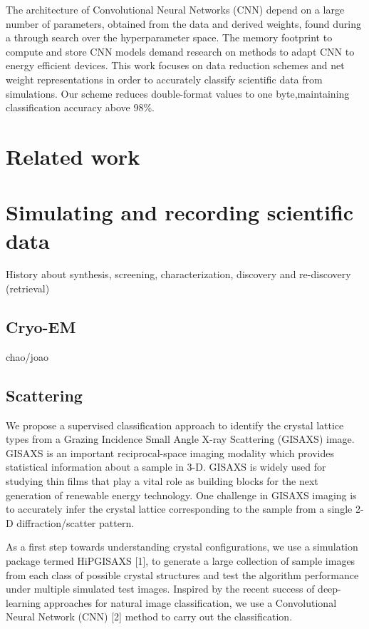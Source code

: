 \documentclass[conference]{IEEEtran}
\begin{document}
The architecture of Convolutional Neural Networks (CNN) depend on a
large number of parameters, obtained from the data and derived weights,
found during a through search over the hyperparameter space. The
memory footprint to compute and store CNN models demand research
on methods to adapt CNN to energy efficient devices. This work focuses
on data reduction schemes and net weight representations in order to
accurately classify scientific data from simulations. Our scheme reduces
double-format values to one byte,maintaining classification accuracy
above 98\%.

\section{Related work}


\section{Simulating and recording scientific data}
History about synthesis, screening, characterization, discovery and re-discovery (retrieval)

\subsection{Cryo-EM}
chao/joao

\subsection{Scattering}
We propose a supervised classification approach to identify the crystal lattice types from a Grazing
Incidence Small Angle X-ray Scattering (GISAXS) image. GISAXS is an important reciprocal-space imaging
modality which provides statistical information about a sample in 3-D. GISAXS is widely used for
studying thin films that play a vital role as building blocks for the next generation of renewable
energy technology. One challenge in GISAXS imaging is to accurately infer the crystal lattice
corresponding to the sample from a single 2-D diffraction/scatter pattern.

As a first step towards understanding crystal configurations, we use a simulation package termed
HiPGISAXS [1], to generate a large collection of sample images from each class of possible crystal
structures and test the algorithm performance under multiple simulated test images. Inspired by the
recent success of deep-learning approaches for natural image classification, we use a Convolutional
Neural Network (CNN) [2] method to carry out the classification.
\end{document}
